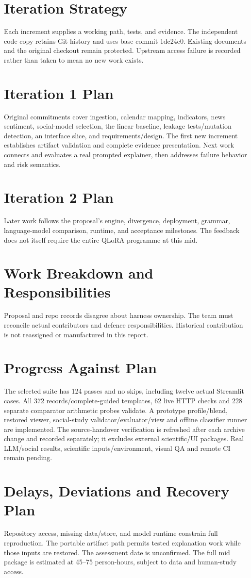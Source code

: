 \section{Iteration Strategy}
Each increment supplies a working path, tests, and evidence. The independent code copy retains Git history and uses base commit 1dc24e0. Existing documents and the original checkout remain protected. Upstream access failure is recorded rather than taken to mean no new work exists.

\section{Iteration 1 Plan}
Original commitments cover ingestion, calendar mapping, indicators, news sentiment, social-model selection, the linear baseline, leakage tests/mutation detection, an interface slice, and requirements/design. The first new increment establishes artifact validation and complete evidence presentation. Next work connects and evaluates a real prompted explainer, then addresses failure behavior and risk semantics.

\section{Iteration 2 Plan}
Later work follows the proposal's engine, divergence, deployment, grammar, language-model comparison, runtime, and acceptance milestones. The feedback does not itself require the entire QLoRA programme at this mid.

\section{Work Breakdown and Responsibilities}
Proposal and repo records disagree about harness ownership. The team must reconcile actual contributors and defence responsibilities. Historical contribution is not reassigned or manufactured in this report.

\section{Progress Against Plan}
The selected suite has 124 passes and no skips, including twelve actual Streamlit cases. All 372 records/complete-guided templates, 62 live HTTP checks and 228 separate comparator arithmetic probes validate. A prototype profile/blend, restored viewer, social-study validator/evaluator/view and offline classifier runner are implemented. The source-handover verification is refreshed after each archive change and recorded separately; it excludes external scientific/UI packages. Real LLM/social results, scientific inputs/environment, visual QA and remote CI remain pending.

\section{Delays, Deviations and Recovery Plan}
Repository access, missing data/store, and model runtime constrain full reproduction. The portable artifact path permits tested explanation work while those inputs are restored. The assessment date is unconfirmed. The full mid package is estimated at 45--75 person-hours, subject to data and human-study access.
